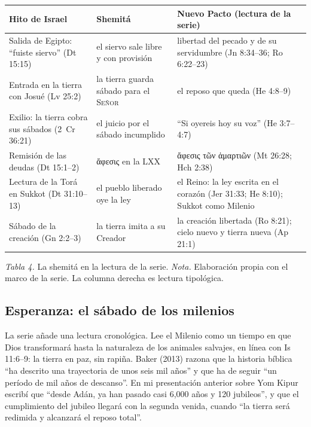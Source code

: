 \documentclass[11pt,letterpaper]{article}
\newcommand{\grc}[1]{\foreignlanguage{ancientgreek}{#1}}
\newcommand{\SENOR}{\textsc{Señor}}
\begin{document}
\begin{center}\small\renewcommand{\arraystretch}{1.22}
\begin{tabular}{@{}L{4.1cm}L{4.6cm}L{5.6cm}@{}}
\toprule
\textbf{Hito de Israel} & \textbf{Shemitá} & \textbf{Nuevo Pacto (lectura de la serie)} \\ \midrule
Salida de Egipto: ``fuiste siervo'' (Dt 15:15) & el siervo sale libre y con provisión & libertad del pecado y de su servidumbre (Jn 8:34--36; Ro 6:22--23) \\
Entrada en la tierra con Josué (Lv 25:2) & la tierra guarda sábado para el \SENOR{} & el reposo que queda (He 4:8--9) \\
Exilio: la tierra cobra sus sábados (2~Cr 36:21) & el juicio por el sábado incumplido & ``Si oyereis hoy su voz'' (He 3:7--4:7) \\
Remisión de las deudas (Dt 15:1--2) & \grc{ἄφεσις} en la LXX & \grc{ἄφεσις τῶν ἁμαρτιῶν} (Mt 26:28; Hch 2:38) \\
Lectura de la Torá en Sukkot (Dt 31:10--13) & el pueblo liberado oye la ley & el Reino: la ley escrita en el corazón (Jer 31:33; He 8:10); Sukkot como Milenio \\
Sábado de la creación (Gn 2:2--3) & la tierra imita a su Creador & la creación libertada (Ro 8:21); cielo nuevo y tierra nueva (Ap 21:1) \\
\bottomrule
\end{tabular}\par
{\footnotesize\color{sepia}\textit{Tabla 4.} La shemitá en la lectura de la serie. \textit{Nota.} Elaboración propia con el marco de la serie. La columna derecha es lectura tipológica.}
\end{center}

\subsection{Esperanza: el sábado de los milenios}
La serie añade una lectura cronológica. Lee el Milenio como un tiempo en que Dios transformará hasta la naturaleza de los animales salvajes, en línea con Is 11:6--9: la tierra en paz, sin rapiña. Baker (2013) razona que la historia bíblica ``ha descrito una trayectoria de unos seis mil años'' y que ha de seguir ``un período de mil años de descanso''. En mi presentación anterior sobre Yom Kipur escribí que ``desde Adán, ya han pasado casi 6,000 años y 120 jubileos'', y que el cumplimiento del jubileo llegará con la segunda venida, cuando ``la tierra será redimida y alcanzará el reposo total''.
\end{document}

